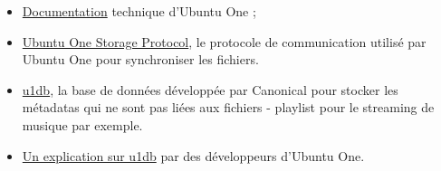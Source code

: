 \begin{itemize}
\renewcommand{\labelitemi}{$\bullet$}
\item \href{https://wiki.ubuntu.com/UbuntuOne/TechnicalDetails}{Documentation} technique d'Ubuntu One ;
\item \href{http://bazaar.launchpad.net/~ubuntuone-control-tower/ubuntuone-storage-protocol/trunk/files}{Ubuntu One Storage Protocol}, le protocole de communication utilisé par Ubuntu One pour synchroniser les fichiers.
\item \href{https://one.ubuntu.com/developer/data/u1db/index}{u1db}, la base de données développée par Canonical pour stocker les métadatas qui ne sont pas liées aux fichiers - playlist pour le streaming de musique par exemple.
\item \href{https://github.com/onitu/Epitech.EIP/wiki/Discussion-du-03-03-13-avec-Chipaca-sur-\%23u1db}{Un explication sur u1db} par des développeurs d'Ubuntu One.
\end{itemize}
